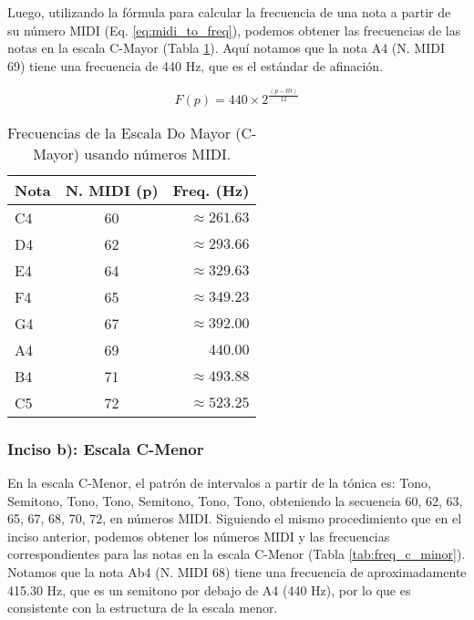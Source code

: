 \documentclass[paper=letter, fontsize=11pt, draft=false]{scrartcl}
\numberwithin{equation}{problemcounter} %
\numberwithin{figure}{problemcounter} %
\numberwithin{table}{problemcounter} %
\numberwithin{subsection}{problemcounter}
\begin{document}
Luego, utilizando la fórmula para calcular la frecuencia de una nota a partir de su número MIDI (Eq. \ref{eq:midi_to_freq}), podemos obtener las frecuencias de las notas en la escala C-Mayor (Tabla \ref{tab:freq_c_major}). Aquí notamos que la nota A4 (N. MIDI 69) tiene una frecuencia de 440 Hz, que es el estándar de afinación.

\begin{equation}
    F(p) = 440 \times 2^{\frac{(p - 69)}{12}}
    \label{eq:midi_to_freq}
\end{equation}

\begin{table}[h]
\centering
\begin{tabular}{|l|c|r|}
\hline
\textbf{Nota} & \textbf{N. MIDI (p)} & \textbf{Freq. (Hz)} \\ \hline
C4            & 60                   & $\approx 261.63$         \\
D4            & 62                   & $\approx 293.66$         \\
E4            & 64                   & $\approx 329.63$         \\
F4            & 65                   & $\approx 349.23$         \\
G4            & 67                   & $\approx 392.00$         \\
A4            & 69                   & $440.00$                 \\
B4            & 71                   & $\approx 493.88$         \\
C5            & 72                   & $\approx 523.25$         \\ \hline
\end{tabular}
\caption{Frecuencias de la Escala Do Mayor (C-Mayor) usando números MIDI.}
\label{tab:freq_c_major}
\end{table}

\newpage
\subsubsection{Inciso b): Escala C-Menor}

En la escala C-Menor, el patrón de intervalos a partir de la tónica es: Tono, Semitono, Tono, Tono, Semitono, Tono, Tono, obteniendo la secuencia 60, 62, 63, 65, 67, 68, 70, 72, en números MIDI. Siguiendo el mismo procedimiento que en el inciso anterior, podemos obtener los números MIDI y las frecuencias correspondientes para las notas en la escala C-Menor (Tabla \ref{tab:freq_c_minor}). Notamos que la nota Ab4 (N. MIDI 68) tiene una frecuencia de aproximadamente 415.30 Hz, que es un semitono por debajo de A4 (440 Hz), por lo que es consistente con la estructura de la escala menor.
\end{document}
